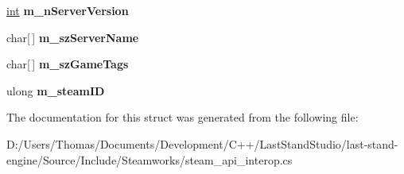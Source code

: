 \begin{DoxyCompactItemize}
\item 
\hypertarget{structValve_1_1Steamworks_1_1gameserveritem__t_a14c2279ff9b8e4edd534e86f27353b92}{}\hyperlink{SDL__thread_8h_a6a64f9be4433e4de6e2f2f548cf3c08e}{int} {\bfseries m\+\_\+n\+Server\+Version}\label{structValve_1_1Steamworks_1_1gameserveritem__t_a14c2279ff9b8e4edd534e86f27353b92}

\item 
\hypertarget{structValve_1_1Steamworks_1_1gameserveritem__t_a41c9a72ba1b743cf2a0db2945b833630}{}char\mbox{[}$\,$\mbox{]} {\bfseries m\+\_\+sz\+Server\+Name}\label{structValve_1_1Steamworks_1_1gameserveritem__t_a41c9a72ba1b743cf2a0db2945b833630}

\item 
\hypertarget{structValve_1_1Steamworks_1_1gameserveritem__t_a9f92d19576ee640bf53b8c7dd290ccc2}{}char\mbox{[}$\,$\mbox{]} {\bfseries m\+\_\+sz\+Game\+Tags}\label{structValve_1_1Steamworks_1_1gameserveritem__t_a9f92d19576ee640bf53b8c7dd290ccc2}

\item 
\hypertarget{structValve_1_1Steamworks_1_1gameserveritem__t_a20df1c4e23aa4af0398fb4e2b9071ec3}{}ulong {\bfseries m\+\_\+steam\+I\+D}\label{structValve_1_1Steamworks_1_1gameserveritem__t_a20df1c4e23aa4af0398fb4e2b9071ec3}

\end{DoxyCompactItemize}


The documentation for this struct was generated from the following file\+:\begin{DoxyCompactItemize}
\item 
D\+:/\+Users/\+Thomas/\+Documents/\+Development/\+C++/\+Last\+Stand\+Studio/last-\/stand-\/engine/\+Source/\+Include/\+Steamworks/steam\+\_\+api\+\_\+interop.\+cs\end{DoxyCompactItemize}
